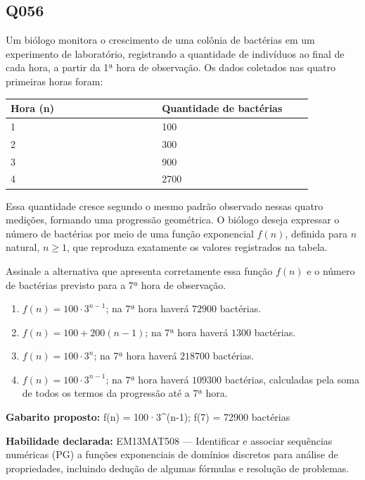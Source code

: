 \documentclass[11pt,a4paper]{article}
\begin{document}
\begin{samepage}
\subsection*{Q056}
Um biólogo monitora o crescimento de uma colônia de bactérias em um experimento de laboratório, registrando a quantidade de indivíduos ao final de cada hora, a partir da 1ª hora de observação. Os dados coletados nas quatro primeiras horas foram:

\begin{center}
\begin{tabular}{|p{0.430\linewidth}|p{0.430\linewidth}|}
\hline
\textbf{Hora (n)} & \textbf{Quantidade de bactérias} \\
\hline
1 & 100 \\
\hline
2 & 300 \\
\hline
3 & 900 \\
\hline
4 & 2700 \\
\hline
\end{tabular}
\end{center}

Essa quantidade cresce segundo o mesmo padrão observado nessas quatro medições, formando uma progressão geométrica. O biólogo deseja expressar o número de bactérias por meio de uma função exponencial $f(n)$, definida para $n$ natural, $n \geq 1$, que reproduza exatamente os valores registrados na tabela.

Assinale a alternativa que apresenta corretamente essa função $f(n)$ e o número de bactérias previsto para a 7ª hora de observação.
\begin{enumerate}[label=(\alph*),nosep,leftmargin=*]
\item $f(n) = 100 \cdot 3^{n-1}$; na 7ª hora haverá $72900$ bactérias.
\item $f(n) = 100 + 200(n-1)$; na 7ª hora haverá $1300$ bactérias.
\item $f(n) = 100 \cdot 3^{n}$; na 7ª hora haverá $218700$ bactérias.
\item $f(n) = 100 \cdot 3^{n-1}$; na 7ª hora haverá $109300$ bactérias, calculadas pela soma de todos os termos da progressão até a 7ª hora.
\end{enumerate}

\textbf{Gabarito proposto:} f(n) = 100·3\textasciicircum{}(n-1); f(7) = 72900 bactérias

\textbf{Habilidade declarada:} EM13MAT508 --- Identificar e associar sequências numéricas (PG) a funções exponenciais de domínios discretos para análise de propriedades, incluindo dedução de algumas fórmulas e resolução de problemas.
\end{samepage}
\end{document}
